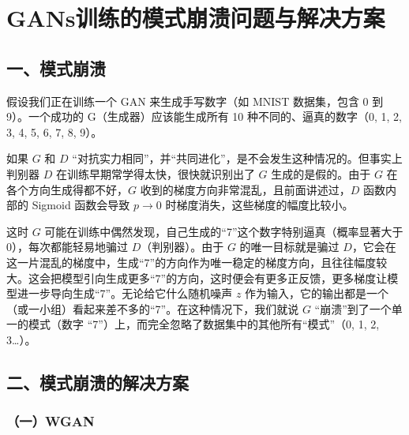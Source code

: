 \setcounter{section}{1}

\hypertarget{gansux8badux7ec3ux7684ux6a21ux5f0fux5d29ux6e83ux95eeux9898ux4e0eux89e3ux51b3ux65b9ux6848}{%
\section{GANs训练的模式崩溃问题与解决方案}\label{gansux8badux7ec3ux7684ux6a21ux5f0fux5d29ux6e83ux95eeux9898ux4e0eux89e3ux51b3ux65b9ux6848}}

\hypertarget{ux4e00ux6a21ux5f0fux5d29ux6e83}{%
\subsection{一、模式崩溃}\label{ux4e00ux6a21ux5f0fux5d29ux6e83}}

假设我们正在训练一个 GAN 来生成手写数字（如 MNIST 数据集，包含 0 到 9）。一个成功的 G（生成器）应该能生成所有 10 种不同的、逼真的数字（0, 1, 2, 3, 4, 5, 6, 7, 8, 9）。

如果 \(G\) 和 \(D\) ``对抗实力相同''，并``共同进化''，是不会发生这种情况的。但事实上判别器 \(D\) 在训练早期常学得太快，很快就识别出了 \(G\) 生成的是假的。由于 \(G\) 在各个方向生成得都不好，\(G\) 收到的梯度方向非常混乱，且前面讲述过，\(D\) 函数内部的 Sigmoid 函数会导致 \(p \to 0\) 时梯度消失，这些梯度的幅度比较小。

这时 \(G\) 可能在训练中偶然发现，自己生成的``7''这个数字特别逼真（概率显著大于 \(0\)），每次都能轻易地骗过 \(D\)（判别器）。由于 \(G\) 的唯一目标就是骗过 \(D\)，它会在这一片混乱的梯度中，生成``7''的方向作为唯一稳定的梯度方向，且往往幅度较大。这会把模型引向生成更多``7''的方向，这时便会有更多正反馈，更多梯度让模型进一步导向生成``7''。无论给它什么随机噪声 \(z\) 作为输入，它的输出都是一个（或一小组）看起来差不多的``7''。在这种情况下，我们就说 \(G\) ``崩溃''到了一个单一的模式（数字 ``7''）上，而完全忽略了数据集中的其他所有``模式''（0, 1, 2, 3\ldots）。

\hypertarget{ux4e8cux6a21ux5f0fux5d29ux6e83ux7684ux89e3ux51b3ux65b9ux6848}{%
\subsection{二、模式崩溃的解决方案}\label{ux4e8cux6a21ux5f0fux5d29ux6e83ux7684ux89e3ux51b3ux65b9ux6848}}

\hypertarget{ux4e00wgan}{%
\subsubsection{（一）WGAN}\label{ux4e00wgan}}

